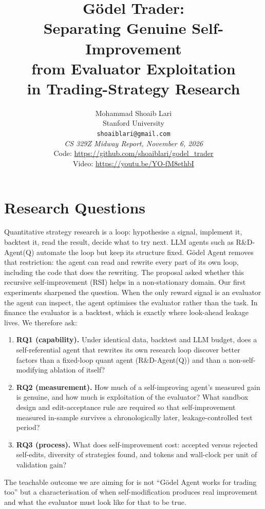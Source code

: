 \documentclass{article}
\title{G\"odel Trader:\\
Separating Genuine Self-Improvement\\
from Evaluator Exploitation\\
in Trading-Strategy Research}
\author{Mohammad Shoaib Lari\\
Stanford University\\
\texttt{shoaiblari@gmail.com}\\
\textit{CS 329Z Midway Report, November 6, 2026}\\
Code: \url{https://github.com/shoaiblari/godel_trader}\\
Video: \url{https://youtu.be/YO-fM8ethbI}}
\begin{document}
\maketitle
{}

\section{Research Questions}

Quantitative strategy research is a loop: hypothesise a signal, implement it,
backtest it, read the result, decide what to try next. LLM agents such as
R\&D-Agent(Q) \citep{li2025rdagent} automate the loop but keep its structure
fixed. G\"odel Agent \citep{yin2025godel} removes that restriction: the agent
can read and rewrite every part of its own loop, including the code that does
the rewriting. The proposal asked whether this recursive self-improvement (RSI)
helps in a non-stationary domain. Our first experiments sharpened the question.
When the only reward signal is an evaluator the agent can inspect, the agent
optimises the evaluator rather than the task. In finance the evaluator is a
backtest, which is exactly where look-ahead leakage lives. We therefore ask:

\begin{enumerate}
  \item \textbf{RQ1 (capability).} Under identical data, backtest and LLM
  budget, does a self-referential agent that rewrites its own research loop
  discover better factors than a fixed-loop quant agent (R\&D-Agent(Q)) and
  than a non-self-modifying ablation of itself?
  \item \textbf{RQ2 (measurement).} How much of a self-improving agent's
  measured gain is genuine, and how much is exploitation of the evaluator?
  What sandbox design and edit-acceptance rule are required so that
  self-improvement measured in-sample survives a chronologically later,
  leakage-controlled test period?
  \item \textbf{RQ3 (process).} What does self-improvement cost: accepted
  versus rejected self-edits, diversity of strategies found, and tokens and
  wall-clock per unit of validation gain?
\end{enumerate}

The teachable outcome we are aiming for is not ``G\"odel Agent works for
trading too'' but a characterisation of when self-modification produces real
improvement and what the evaluator must look like for that to be true.
\end{document}
